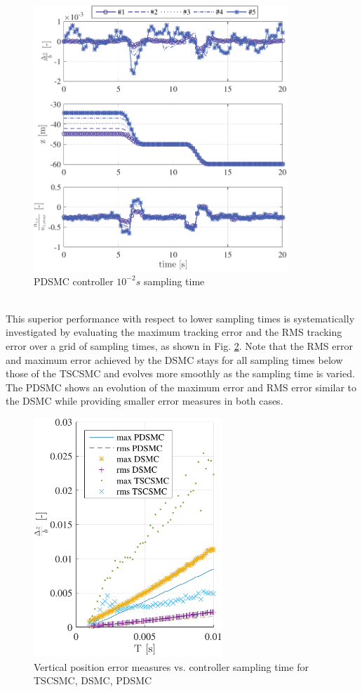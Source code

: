 \documentclass{ifacconf}
\begin{document}
\begin{figure}[h!]
\begin{center}
\includegraphics[width=\columnwidth,height=10cm]{PDSMC-100Hz-TIMESCALESEPARATION-turbulence=1}    %
\caption{ PDSMC controller $10^{-2} s$ sampling time}
\label{fig:PDSMC100Hz}
\end{center}
\end{figure}\\
This superior performance with respect to lower sampling times is systematically investigated by evaluating the maximum tracking error and the RMS tracking error over a grid of sampling times, as shown in Fig. \ref{fig:errorvssamplingtime}. Note that the RMS error and maximum error achieved by the DSMC stays for all sampling times below those of the TSCSMC and evolves more smoothly as the sampling time is varied. The PDSMC shows an evolution of the maximum error and RMS error similar to the DSMC while providing smaller error measures in both cases.\\
\begin{figure}[h!]
\begin{center}
\includegraphics[width=0.9\columnwidth,height=9cm]{error-z-vs-samplingtime.pdf}    %
\caption{Vertical position error measures vs. controller sampling time for TSCSMC, DSMC, PDSMC}
\label{fig:errorvssamplingtime}
\end{center}
\end{figure}
\end{document}
